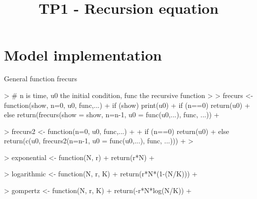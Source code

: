 \documentclass{article}
\begin{document}


\title{TP1 - Recursion equation}

\maketitle

\section{Model implementation}

General function frecurs
\begin{Schunk}
\begin{Sinput}
> # n is time, u0 the initial condition, func the recursive function
> 
> frecurs <- function(show, n=0, u0, func,...) {
+   if (show) print(u0)
+   if (n==0) return(u0)
+   else return(frecurs(show = show, n=n-1, u0 = func(u0,...), func, ...))
+ }
\end{Sinput}
\end{Schunk}

\begin{Schunk}
\begin{Sinput}
> frecurs2 <- function(n=0, u0, func,...) {
+   
+   if (n==0) return(u0)
+   else return(c(u0, frecurs2(n=n-1, u0 = func(u0,...), func, ...)))
+ }
> 
\end{Sinput}
\end{Schunk}


\begin{Schunk}
\begin{Sinput}
> exponential <- function(N, r) {
+   return(r*N)
+ }
\end{Sinput}
\end{Schunk}

\begin{Schunk}
\begin{Sinput}
> logarithmic <- function(N, r, K) {
+   return(r*N*(1-(N/K)))
+ }
\end{Sinput}
\end{Schunk}

\begin{Schunk}
\begin{Sinput}
> gompertz <- function(N, r, K) {
+   return(-r*N*log(N/K))
+ }
\end{Sinput}
\end{Schunk}
\end{document}
